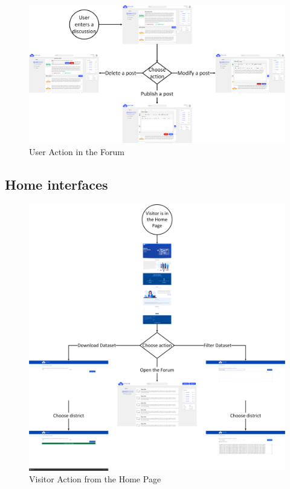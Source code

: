 \begin{figure}[h!]
        \centering
        \includegraphics[scale=0.12]{images/interfaces/user_action_forum_interface.png}
        \caption{User Action in the Forum}
        \label{fig:user_action_forum}
\end{figure}
\FloatBarrier

\newpage
\subsection{Home interfaces}

\begin{figure}[h!]
        \centering
        \includegraphics[scale=0.12]{images/interfaces/visitor_interface.png}
        \caption{Visitor Action from the Home Page}
        \label{fig:visitor_action_forum}
\end{figure}
\FloatBarrier